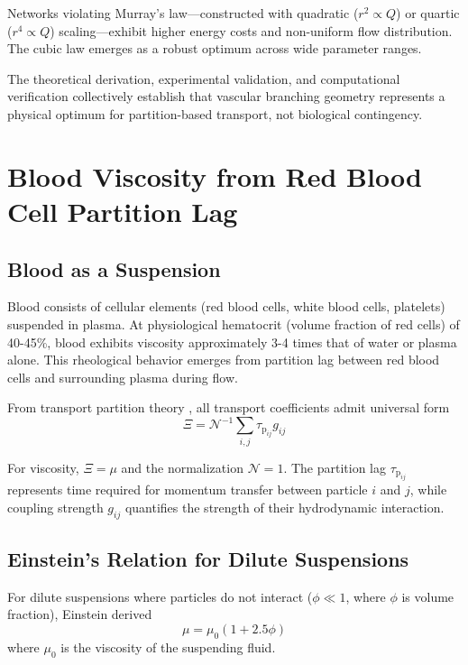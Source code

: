 \documentclass[12pt,a4paper]{article}
\theoremstyle{remark}
\newcommand{\taulag}{\tau_{\mathrm{p}}}
\begin{document}
Networks violating Murray's law—constructed with quadratic ($r^{2} \propto Q$) or quartic ($r^{4} \propto Q$) scaling—exhibit higher energy costs and non-uniform flow distribution. The cubic law emerges as a robust optimum across wide parameter ranges.

The theoretical derivation, experimental validation, and computational verification collectively establish that vascular branching geometry represents a physical optimum for partition-based transport, not biological contingency.

\section{Blood Viscosity from Red Blood Cell Partition Lag}
\label{sec:viscosity}

\subsection{Blood as a Suspension}

Blood consists of cellular elements (red blood cells, white blood cells, platelets) suspended in plasma. At physiological hematocrit (volume fraction of red cells) of 40-45\%, blood exhibits viscosity approximately 3-4 times that of water or plasma alone. This rheological behavior emerges from partition lag between red blood cells and surrounding plasma during flow.

From transport partition theory \cite{sachikonye2024transport}, all transport coefficients admit universal form
\begin{equation}
\Xi = \mathcal{N}^{-1} \sum_{i,j} \taulag_{ij} g_{ij}
\end{equation}

For viscosity, $\Xi = \mu$ and the normalization $\mathcal{N} = 1$. The partition lag $\taulag_{ij}$ represents time required for momentum transfer between particle $i$ and $j$, while coupling strength $g_{ij}$ quantifies the strength of their hydrodynamic interaction.

\subsection{Einstein's Relation for Dilute Suspensions}

For dilute suspensions where particles do not interact ($\phi \ll 1$, where $\phi$ is volume fraction), Einstein derived \cite{einstein1906new}
\begin{equation}
\mu = \mu_{0}(1 + 2.5\phi)
\label{eq:einstein}
\end{equation}
where $\mu_{0}$ is the viscosity of the suspending fluid.
\end{document}
